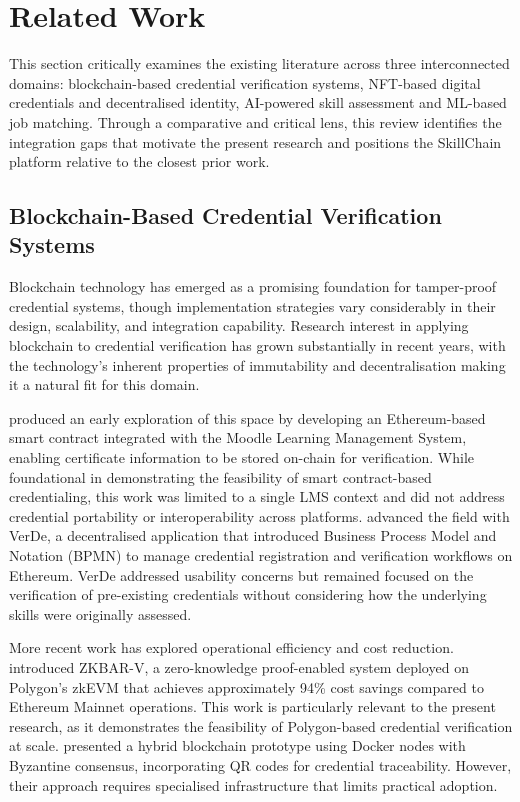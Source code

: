 
\section{Related Work}
\label{sec:rw}

This section critically examines the existing literature across three interconnected domains: blockchain-based credential verification systems, NFT-based digital credentials and decentralised identity, AI-powered skill assessment and ML-based job matching. Through a comparative and critical lens, this review identifies the integration gaps that motivate the present research and positions the SkillChain platform relative to the closest prior work.

\subsection{Blockchain-Based Credential Verification Systems}
\label{sec:BlockchainCredentials}

Blockchain technology has emerged as a promising foundation for tamper-proof credential systems, though implementation strategies vary considerably in their design, scalability, and integration capability. Research interest in applying blockchain to credential verification has grown substantially in recent years, with the technology's inherent properties of immutability and decentralisation making it a natural fit for this domain.

\citet{Karatas2018} produced an early exploration of this space by developing an Ethereum-based smart contract integrated with the Moodle Learning Management System, enabling certificate information to be stored on-chain for verification. While foundational in demonstrating the feasibility of smart contract-based credentialing, this work was limited to a single LMS context and did not address credential portability or interoperability across platforms. \citet{Nousias2022} advanced the field with VerDe, a decentralised application that introduced Business Process Model and Notation (BPMN) to manage credential registration and verification workflows on Ethereum. VerDe addressed usability concerns but remained focused on the verification of pre-existing credentials without considering how the underlying skills were originally assessed.

More recent work has explored operational efficiency and cost reduction. \citet{Moya2025} introduced ZKBAR-V, a zero-knowledge proof-enabled system deployed on Polygon's zkEVM that achieves approximately 94\% cost savings compared to Ethereum Mainnet operations. This work is particularly relevant to the present research, as it demonstrates the feasibility of Polygon-based credential verification at scale. \citet{Cardenas2025} presented a hybrid blockchain prototype using Docker nodes with Byzantine consensus, incorporating QR codes for credential traceability. However, their approach requires specialised infrastructure that limits practical adoption.

